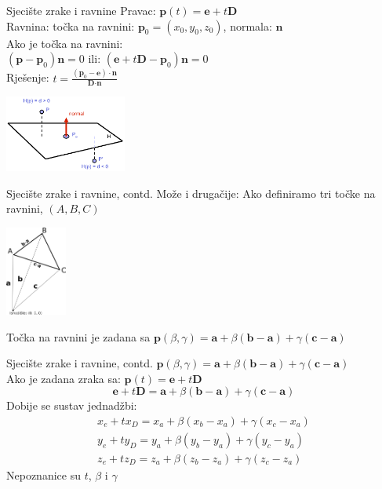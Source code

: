 \documentclass[9pt]{beamer}
\begin{document}
\begin{frame}{Sjecište zrake i ravnine}
Pravac: $\textbf{p}(t) = \textbf{e}+t\textbf{D}$
\\Ravnina: točka na ravnini: $\textbf{p}_0 = (x_0, y_0, z_0)$, normala: $\textbf{n}$
\\Ako je točka na ravnini:\\
$(\textbf{p} - \textbf{p}_0)\textbf{n}=0$
ili:
$(\textbf{e} +t\textbf{D}- \textbf{p}_0)\textbf{n}=0$
\\Rješenje: $t = \frac{(\textbf{p}_0-\textbf{e})\cdot\textbf{n}}{\textbf{D}\cdot\textbf{n}}$

\begin{center}
\includegraphics[width=4cm]{slike/ray_ravnina.png}
\end{center}
\end{frame}	

\begin{frame}{Sjecište zrake i ravnine, contd.}
Može i drugačije: Ako definiramo tri točke na ravnini, $(A, B, C)$ 
\begin{center}
\includegraphics[width=2cm]{slike/ravnina_vector.png}
\end{center}
Točka na ravnini je zadana sa 
$\textbf{p}(\beta, \gamma) = \textbf{a} + \beta(\textbf{b}-\textbf{a}) + \gamma(\textbf{c}-\textbf{a})$
\end{frame}	

\begin{frame}{Sjecište zrake i ravnine, contd.}
$\textbf{p}(\beta, \gamma) = \textbf{a} + \beta(\textbf{b}-\textbf{a}) + \gamma(\textbf{c}-\textbf{a})$ 
\\
Ako je zadana zraka sa: $\textbf{p}(t) = \textbf{e}+t\textbf{D}$
$$\textbf{e}+t\textbf{D} = \textbf{a} + \beta(\textbf{b}-\textbf{a}) + \gamma(\textbf{c}-\textbf{a})$$
Dobije se sustav jednadžbi:
\begin{align*}
x_e+tx_D = x_a + \beta(x_b-x_a) + \gamma(x_c-x_a)\\
y_e+ty_D = y_a + \beta(y_b-y_a) + \gamma(y_c-y_a)\\
z_e+tz_D = z_a + \beta(z_b-z_a) + \gamma(z_c-z_a)
\end{align*}
Nepoznanice su $t$, $\beta$ i $\gamma$
\end{frame}	
\end{document}
